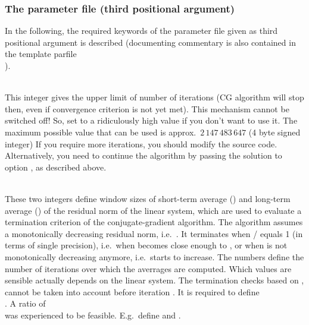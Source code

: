 \subsubsection{The parameter file  (third positional argument)}
In the following, the required keywords of the parameter file given as third positional argument is described 
(documenting commentary is also contained in the template parfile\\
).

\textbf{}\\
This integer gives the upper limit of number of iterations (CG algorithm will stop then, even if convergence 
criterion is not yet met).
This mechanism cannot be switched off! So, set to a ridiculously high value if you don't want to use it. 
The maximum possible value that can be used is approx.\ $2\,147\,483\,647$ (4 byte signed integer)
If you require more iterations, you should modify the source code. Alternatively, you need to continue the 
algorithm by passing the solution to option , as described above.

\textbf{}\\
These two integers define window sizes of short-term average () and long-term average () 
of the residual norm of the linear system, which are used to evaluate a termination criterion of the 
conjugate-gradient algorithm. The algorithm assumes a monotonically decreasing residual norm, 
i.e.\ .
It terminates when / equals 1 (in terms of single precision), i.e.\ when  
becomes close enough to , or when  is not monotonically decreasing anymore, i.e.\ starts 
to increase.
The numbers  define the number of iterations over which the averrages are 
computed. Which values are sensible actually depends on the linear system. 
The termination checks based on ,  cannot be taken into account before iteration 
. It is required to define\\
.
A ratio of \\
 was experienced to be feasible. E.g.\ define 
and .

